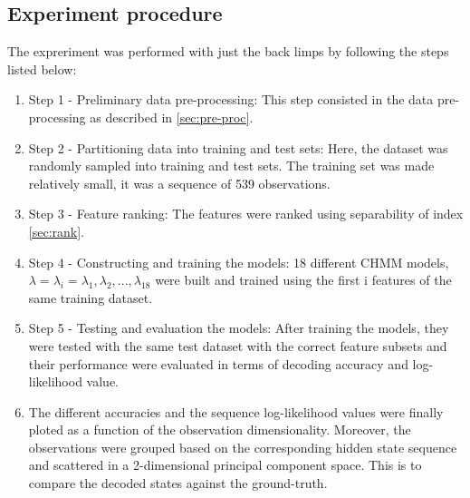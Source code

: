 \subsection{Experiment procedure}
The expreriment was performed with just the back limps by following the steps listed below:
\begin{enumerate}
	\item Step 1 - Preliminary data pre-processing: This step consisted in the data pre-processing as described in \ref{sec:pre-proc}.
	\item Step 2 - Partitioning data into training and test sets: Here, the dataset was randomly sampled into training and test sets. The training set was made relatively small, it was a sequence of 539 observations. 
	\item Step 3 -  Feature ranking: The features were ranked using separability of index \ref{sec:rank}. 
	\item Step 4 - Constructing and training the models: 18 different CHMM models, \(\lambda = {\lambda_i} = \lambda_1, \lambda_2, ..., \lambda_18\) were built and trained using the first i features of the same training dataset.
	\item Step 5 - Testing and evaluation the models: After training the models, they were tested with the same test dataset with the correct feature subsets and their performance were evaluated in terms of decoding accuracy and log-likelihood value. 
	\item The different accuracies and the sequence log-likelihood values were finally ploted as a function of the observation dimensionality. Moreover, the observations were grouped based on the corresponding hidden state sequence and scattered in a 2-dimensional principal component space. This is to compare the decoded states against the ground-truth.
\end{enumerate}


